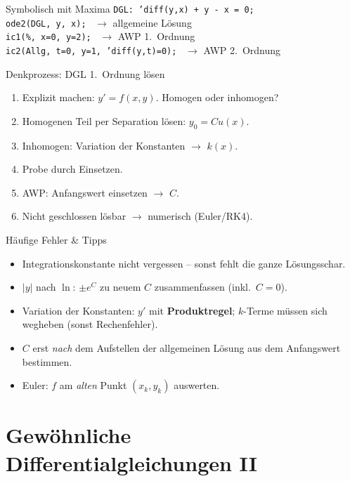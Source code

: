 \documentclass[a4paper, fontsize=7pt]{scrartcl}
\begin{document}
\begin{subbox}{Symbolisch mit Maxima}
\texttt{DGL: 'diff(y,x) + y - x = 0;}\\
\texttt{ode2(DGL, y, x);} \ $\to$ allgemeine Lösung\\
\texttt{ic1(\%, x=0, y=2);} \ $\to$ AWP 1.\ Ordnung\\
\texttt{ic2(Allg, t=0, y=1, 'diff(y,t)=0);} \ $\to$ AWP 2.\ Ordnung
\end{subbox}

\begin{subbox}{Denkprozess: DGL 1.\ Ordnung lösen}
\begin{enumerate}
    \item Explizit machen: $y' = f(x, y)$. Homogen oder inhomogen?
    \item Homogenen Teil per Separation lösen: $y_0 = Cu(x)$.
    \item Inhomogen: Variation der Konstanten $\to$ $k(x)$.
    \item Probe durch Einsetzen.
    \item AWP: Anfangswert einsetzen $\to$ $C$.
    \item Nicht geschlossen lösbar $\to$ numerisch (Euler/RK4).
\end{enumerate}
\end{subbox}

\begin{subbox}{Häufige Fehler \& Tipps}
\begin{itemize}
    \item Integrationskonstante nicht vergessen -- sonst fehlt die
          ganze Lösungsschar.
    \item $|y|$ nach $\ln$: $\pm e^{C}$ zu neuem $C$ zusammenfassen
          (inkl.\ $C = 0$).
    \item Variation der Konstanten: $y'$ mit \textbf{Produktregel};
          $k$-Terme müssen sich wegheben (sonst Rechenfehler).
    \item $C$ erst \emph{nach} dem Aufstellen der allgemeinen Lösung aus
          dem Anfangswert bestimmen.
    \item Euler: $f$ am \emph{alten} Punkt $(x_k, y_k)$ auswerten.
\end{itemize}
\end{subbox}

\section{Gewöhnliche Differentialgleichungen II}
\end{document}

